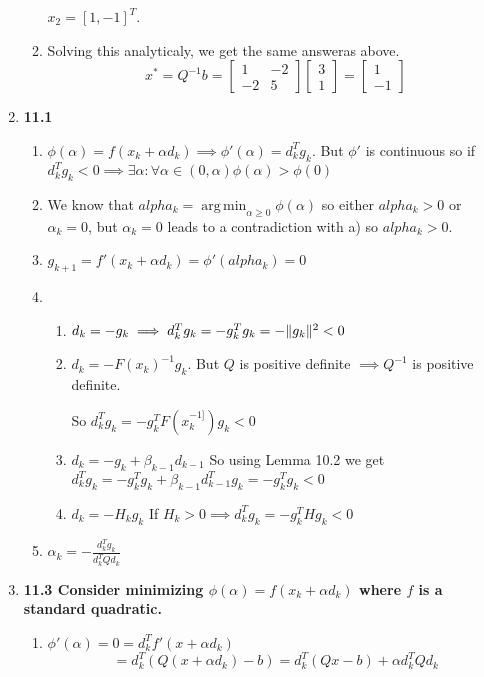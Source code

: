 \documentclass[10pt,a4paper]{article}
\DeclareMathOperator*{\argmin}{arg\,min}
\DeclarePairedDelimiter{\l2}{\lVert}{\rVert}
\begin{document}
\begin{enumerate}
\begin{enumerate}
        $x_2 = [1, -1]^T$.

        \item Solving this analyticaly, we get the same answeras above.
        $$x^* = Q^{-1}b = \begin{bmatrix} 1 & -2 \\ -2 & 5\end{bmatrix} \begin{bmatrix} 3 \\ 1\end{bmatrix} = \begin{bmatrix} 1 \\ -1 \end{bmatrix}$$
    \end{enumerate}

    \item \textbf{11.1}
    \begin{enumerate}
        \item $\phi(\alpha) = f(x_k + \alpha d_k) \implies  \phi'(\alpha) = d_k^Tg_k$. But $\phi'$ is continuous so if $d_k^Tg_k < 0 \implies \exists \alpha : \forall \alpha \in (0, \alpha) \phi(\alpha) > \phi(0)$ 
        \item We know that $alpha_k = \argmin_{\alpha \geq 0} \phi(\alpha)$ so either $alpha_k > 0$ or $\alpha_k = 0$, but $\alpha_k = 0 $ leads to a contradiction with a) so $alpha_k > 0$.
        \item $g_{k+1} = f'(x_k + \alpha d_k) = \phi'(alpha_k) = 0 $
        \item \begin{enumerate}
            \item $d_k = -g_k \implies d_k^Tg_k = -g_k^Tg_k = - \l2{g_k}^2 < 0$
            \item $d_k = -F(x_k)^{-1} g_k$. But $Q$ is positive definite $\implies Q^{-1}$ is positive definite.
            
            So $d_k^Tg_k = -g_k^TF(x_k^{-1]})g_k < 0$
            \item $d_k = -g_k + \beta_{k-1} d_{k-1}$
            So using Lemma 10.2 we get $d_k^Tg_k = -g_k^Tg_k + \beta_{k-1}d_{k-1}^Tg_k = - g_k^Tg_k <0$
            \item $d_k = -H_k g_k $ If $H_k > 0 \implies d_k^Tg_k =  - g_k^THg_k < 0 $
        \end{enumerate}
        \item $\alpha_k = -\frac{d_k^Tg_k}{d_k^TQd_k}$
    \end{enumerate}
    
    \item \textbf{11.3 Consider minimizing $\phi(\alpha) = f(x_k + \alpha d_k)$ where $f$ is a standard quadratic.}
    \begin{enumerate}
        \item $\phi'(\alpha) = 0 = d_k^Tf'(x+ \alpha d_k)$
        $$ = d_k^T(Q(x+\alpha d_k) - b) = d_k^T(Qx - b) + \alpha d_k^TQd_k$$


\end{enumerate}
\end{enumerate}
\end{document}
